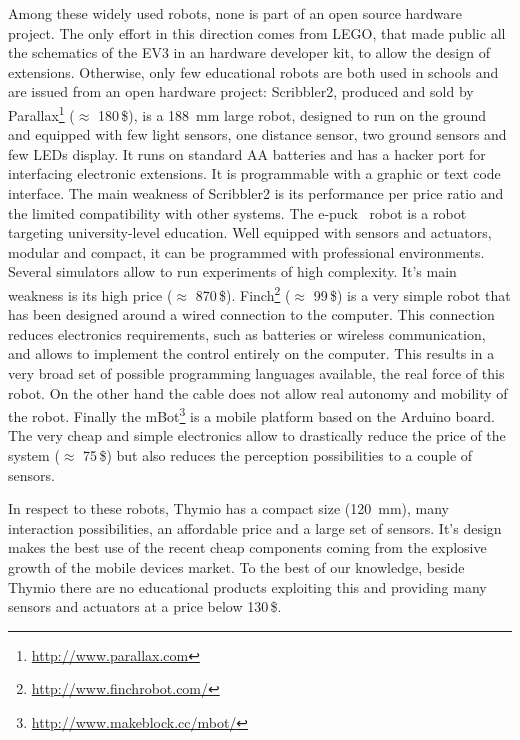 \documentclass[letterpaper, 10 pt, conference]{ieeeconf}  %
\begin{document}
Among these widely used robots, none is part of an open source hardware project.
The only effort in this direction comes from LEGO, that made public all the schematics of the EV3 in an hardware developer kit, to allow the design of extensions. 
Otherwise, only few educational robots are both used in schools and are issued from an open hardware project:
Scribbler2, produced and sold by Parallax\footnote{\url{http://www.parallax.com}} ($\approx$ 180\,\$), is a 188~mm large robot, designed to run on the ground and equipped with few light sensors, one distance sensor, two ground sensors and few LEDs display.
It runs on standard AA batteries and has a hacker port for interfacing electronic extensions.
It is programmable with a graphic or text code interface.  
The main weakness of Scribbler2 is its performance per price ratio and the limited compatibility with other systems. 
The e-puck~\cite{mondada2009puck} robot is a robot targeting university-level education.
Well equipped with sensors and actuators, modular and compact, it can be programmed with professional environments.
Several simulators allow to run experiments of high complexity. 
It's main weakness is its high price ($\approx$ 870\,\$).
Finch\footnote{\url{http://www.finchrobot.com/}} ($\approx$ 99\,\$) is a very simple robot that has been designed around a wired connection to the computer. 
This connection reduces electronics requirements, such as batteries or wireless communication, and allows to implement the control entirely on the computer.
This results in a very broad set of possible programming languages available, the real force of this robot. 
On the other hand the cable does not allow real autonomy and mobility of the robot.
Finally the mBot\footnote{\url{http://www.makeblock.cc/mbot/}} is a mobile platform based on the Arduino board. 
The very cheap and simple electronics allow to drastically reduce the price of the system ($\approx$ 75\,\$) but also reduces the perception possibilities to a couple of sensors. 

In respect to these robots, Thymio has a compact size (120~mm), many interaction possibilities, an affordable price and a large set of sensors.
It's design makes the best use of the recent cheap components coming from the explosive growth of the mobile devices market. 
To the best of our knowledge, beside Thymio there are no educational products exploiting this and providing many sensors and actuators at a price below 130\,\$.
\end{document}
